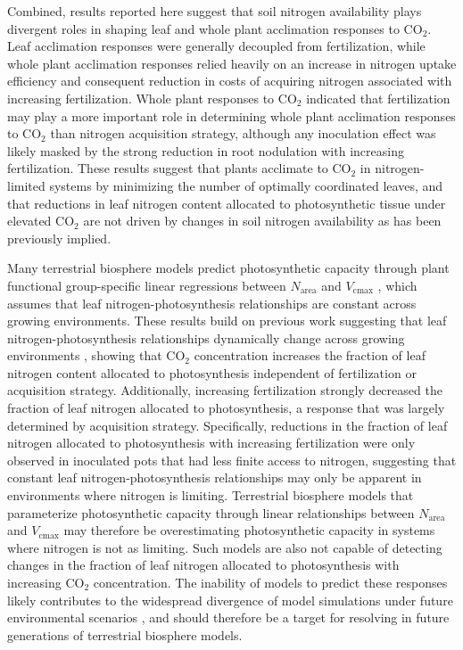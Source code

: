 Combined, results reported here suggest that soil nitrogen availability plays divergent roles in shaping leaf and whole plant acclimation responses to CO$_2$. Leaf acclimation responses were generally decoupled from fertilization, while whole plant acclimation responses relied heavily on an increase in nitrogen uptake efficiency and consequent reduction in costs of acquiring nitrogen associated with increasing fertilization. Whole plant responses to CO$_2$ indicated that fertilization may play a more important role in determining whole plant acclimation responses to CO$_2$ than nitrogen acquisition strategy, although any inoculation effect was likely masked by the strong reduction in root nodulation with increasing fertilization. These results suggest that plants acclimate to CO$_2$ in nitrogen-limited systems by minimizing the number of optimally coordinated leaves, and that reductions in leaf nitrogen content allocated to photosynthetic tissue under elevated CO$_2$ are not driven by changes in soil nitrogen availability as has been previously implied.

Many terrestrial biosphere models predict photosynthetic capacity through plant functional group-specific linear regressions between $N_\mathrm{area}$ and $V_\mathrm{cmax}$ , which assumes that leaf nitrogen-photosynthesis relationships are constant across growing environments. These results build on previous work suggesting that leaf nitrogen-photosynthesis relationships dynamically change across growing environments , showing that CO$_2$ concentration increases the fraction of leaf nitrogen content allocated to photosynthesis independent of fertilization or acquisition strategy. Additionally, increasing fertilization strongly decreased the fraction of leaf nitrogen allocated to photosynthesis, a response that was largely determined by acquisition strategy. Specifically, reductions in the fraction of leaf nitrogen allocated to photosynthesis with increasing fertilization were only observed in inoculated pots that had less finite access to nitrogen, suggesting that constant leaf nitrogen-photosynthesis relationships may only be apparent in environments where nitrogen is limiting. Terrestrial biosphere models that parameterize photosynthetic capacity through linear relationships between $N_\mathrm{area}$ and $V_\mathrm{cmax}$  may therefore be overestimating photosynthetic capacity in systems where nitrogen is not as limiting. Such models are also not capable of detecting changes in the fraction of leaf nitrogen allocated to photosynthesis with increasing CO$_2$ concentration. The inability of models to predict these responses likely contributes to the widespread divergence of model simulations under future environmental scenarios , and should therefore be a target for resolving in future generations of terrestrial biosphere models.

